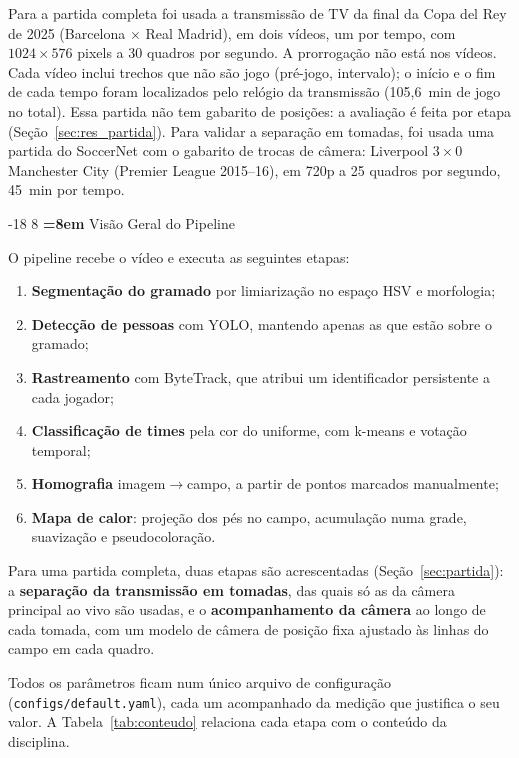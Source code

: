 \documentclass[12pt]{article}
\makeatletter
\renewcommand\subsection{\@startsection{subsection}{2}{\z@}%
                       {-18\p@ \@plus -4\p@ \@minus -4\p@}%
                       {8\p@ \@plus 4\p@ \@minus 4\p@}%
                       {\normalfont\normalsize\bfseries\boldmath
                        \rightskip=\z@ \@plus 8em\pretolerance=10000 }}
\makeatother
\begin{document}
Para a partida completa foi usada a transmissão de TV da final da Copa del Rey de
2025 (Barcelona $\times$ Real Madrid), em dois vídeos, um por tempo, com
$1024\times576$ pixels a 30 quadros por segundo. A prorrogação não está nos vídeos.
Cada vídeo inclui trechos que não são jogo (pré-jogo, intervalo); o início e o fim
de cada tempo foram localizados pelo relógio da transmissão (105,6~min de jogo no
total). Essa partida não tem gabarito de posições: a avaliação é feita por etapa
(Seção~\ref{sec:res_partida}). Para validar a separação em tomadas, foi usada uma
partida do SoccerNet \cite{deliege2021} com o gabarito de trocas de câmera: Liverpool
$3\times0$ Manchester City (Premier League 2015--16), em 720p a 25 quadros por
segundo, 45~min por tempo.

\subsection{Visão Geral do Pipeline}

O pipeline recebe o vídeo e executa as seguintes etapas:

\begin{enumerate}
  \item \textbf{Segmentação do gramado} por limiarização no espaço HSV e morfologia;
  \item \textbf{Detecção de pessoas} com YOLO, mantendo apenas as que estão sobre o gramado;
  \item \textbf{Rastreamento} com ByteTrack, que atribui um identificador persistente a cada jogador;
  \item \textbf{Classificação de times} pela cor do uniforme, com k-means e votação temporal;
  \item \textbf{Homografia} imagem$\rightarrow$campo, a partir de pontos marcados manualmente;
  \item \textbf{Mapa de calor}: projeção dos pés no campo, acumulação numa grade,
        suavização e pseudocoloração.
\end{enumerate}

Para uma partida completa, duas etapas são acrescentadas
(Seção~\ref{sec:partida}): a \textbf{separação da transmissão em tomadas}, das quais só
as da câmera principal ao vivo são usadas, e o \textbf{acompanhamento da câmera} ao
longo de cada tomada, com um modelo de câmera de posição fixa ajustado às linhas do
campo em cada quadro.

Todos os parâmetros ficam num único arquivo de configuração
(\texttt{configs/default.yaml}), cada um acompanhado da medição que justifica o seu
valor. A Tabela~\ref{tab:conteudo} relaciona cada etapa com o conteúdo da
disciplina.
\end{document}
